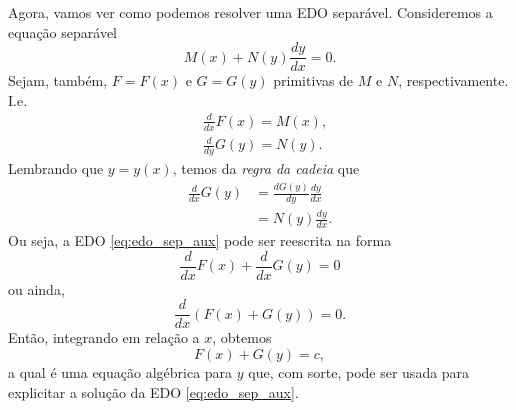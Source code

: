 Agora, vamos ver como podemos resolver uma EDO separável. Consideremos a equação separável
\begin{equation}\label{eq:edo_sep_aux}
  M(x) + N(y)\frac{dy}{dx} = 0.
\end{equation}
Sejam, também, $F=F(x)$ e $G=G(y)$ primitivas de $M$ e $N$, respectivamente. I.e.
\begin{align}
  &\frac{d}{dx}F(x) = M(x),\\
  &\frac{d}{dy}G(y) = N(y).
\end{align}
Lembrando que $y = y(x)$, temos da \emph{regra da cadeia} que
\begin{align}
  \frac{d}{dx}G(y) &= \frac{d G(y)}{dy}\frac{dy}{dx} \\
  &= N(y)\frac{dy}{dx}.
\end{align}
Ou seja, a EDO \eqref{eq:edo_sep_aux} pode ser reescrita na forma
\begin{equation}
  \frac{d}{dx}F(x) + \frac{d}{dx}G(y) = 0
\end{equation}
ou ainda,
\begin{equation}
  \frac{d}{dx}\left(F(x) + G(y)\right) = 0.
\end{equation}
Então, integrando em relação a $x$, obtemos
\begin{equation}
  F(x) + G(y) = c,
\end{equation}
a qual é uma equação algébrica para $y$ que, com sorte, pode ser usada para explicitar a solução da EDO \eqref{eq:edo_sep_aux}.

